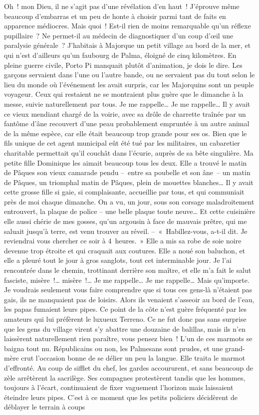 \documentclass[french,twoside]{book} %
\begin{document}
\noindent Oh ! mon Dieu, il ne s’agit pas d’une révélation d’en haut ! J’éprouve même beaucoup d’embarras et un peu de honte à choisir parmi tant de faits en apparence médiocres. Mais quoi ! Est-il rien de moins remarquable qu’un réflexe pupillaire ? Ne permet-il au médecin de diagnostiquer d’un coup d’œil une paralysie générale ? J’habitais à Majorque un petit village au bord de la mer, et qui n’est d’ailleurs qu’un faubourg de Palma, éloigné de cinq kilomètres. En pleine guerre civile, Porto Pi manquait plutôt d’animation, je dois le dire. Les garçons servaient dans l’une ou l’autre bande, ou ne servaient pas du tout selon le lieu du monde où l’événement les avait surpris, car les Majorquins sont un peuple voyageur. Ceux qui restaient ne se montraient plus guère que le dimanche à la messe, suivie naturellement par tous. Je me rappelle… Je me rappelle… Il y avait ce vieux mendiant chargé de la voirie, avec sa drôle de charrette traînée par un fantôme d’âne recouvert d’une peau probablement empruntée à un autre animal de la même espèce, car elle était beaucoup trop grande pour ses os. Bien que le fils unique de cet agent municipal eût été tué par les militaires, un cabaretier charitable permettait qu’il couchât dans l’écurie, auprès de sa bête singulière. Ma petite fille Dominique les aimait beaucoup tous les deux. Elle a trouvé le matin de Pâques son vieux camarade pendu – entre sa poubelle et son âne – un matin de Pâques, un triomphal matin de Pâques, plein de mouettes blanches… Il y avait cette grosse fille si gaie, si complaisante, accueillie par tous, et qui communiait près de moi chaque dimanche. On a vu, un jour, sous son corsage maladroitement entrouvert, la plaque de police – une belle plaque toute neuve… Et cette cuisinière elle aussi chérie de mes gosses, qu’un argousin à face de mauvais prêtre, qui me saluait jusqu’à terre, est venu trouver au réveil. – « Habillez-vous, a-t-il dit. Je reviendrai vous chercher ce soir à 4 heures. » Elle a mis sa robe de soie noire devenue trop étroite et qui craquait aux coutures. Elle a noué son baluchon, et elle a pleuré tout le jour à gros sanglots, tout cet interminable jour. Je l’ai rencontrée dans le chemin, trottinant derrière son maître, et elle m’a fait le salut fasciste, misère !… misère !… Je me rappelle… Je me rappelle… Mais qu’importe. Je voudrais seulement vous faire comprendre que si tous ces gens-là n’étaient pas gais, ils ne manquaient pas de loisirs. Alors ils venaient s’asseoir au bord de l’eau, les papas fumaient leurs pipes. Ce point de la côte n’est guère fréquenté par les amateurs qui lui préfèrent le luxueux Terreno. Ce ne fut donc pas sans surprise que les gens du village virent s’y abattre une douzaine de balillas, mais ils n’en laissèrent naturellement rien paraître, vous pensez bien ! L’un de ces marmots se baigna tout nu. Républicains ou non, les Palmesans sont prudes, et une grand-mère crut l’occasion bonne de se délier un peu la langue. Elle traita le marmot d’effronté. Au coup de sifflet du chef, les gardes accoururent, et sans beaucoup de zèle arrêtèrent la sacrilège. Ses compagnes protestèrent tandis que les hommes, toujours à l’écart, continuaient de fixer vaguement l’horizon mais laissaient éteindre leurs pipes. C’est à ce moment que les petits policiers décidèrent de déblayer le terrain à coups 
\end{document}
